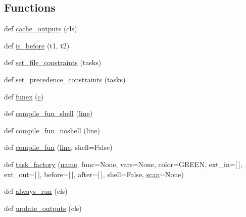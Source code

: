 \subsection*{Functions}
\begin{DoxyCompactItemize}
\item 
def \hyperlink{namespacewaflib_1_1_task_a333db1cc7c2da34b0f075a6806aa4fb0}{cache\+\_\+outputs} (cls)
\item 
def \hyperlink{namespacewaflib_1_1_task_a310bd3e0cfd5029a30d31fc0b9d74ebc}{is\+\_\+before} (t1, t2)
\item 
def \hyperlink{namespacewaflib_1_1_task_acc993d37750a37787ed0b8f659f1c0bf}{set\+\_\+file\+\_\+constraints} (tasks)
\item 
def \hyperlink{namespacewaflib_1_1_task_a0ac0b790b0d39c7a9c17c521b25b8cee}{set\+\_\+precedence\+\_\+constraints} (tasks)
\item 
def \hyperlink{namespacewaflib_1_1_task_a0fe5bbefccccafa511b2b51377f60bdc}{funex} (\hyperlink{rfft2d_test_m_l_8m_ae0323a9039add2978bf5b49550572c7c}{c})
\item 
def \hyperlink{namespacewaflib_1_1_task_a2c264ecea0ed1b0ef6774cd499f30364}{compile\+\_\+fun\+\_\+shell} (\hyperlink{seqread_8c_aad9ebcdde542d8b2075615388ff15a9c}{line})
\item 
def \hyperlink{namespacewaflib_1_1_task_afb4b30ad29fc76227e019d80c31d99ea}{compile\+\_\+fun\+\_\+noshell} (\hyperlink{seqread_8c_aad9ebcdde542d8b2075615388ff15a9c}{line})
\item 
def \hyperlink{namespacewaflib_1_1_task_ab362b343e90d74ae2992b6f1e51cf58e}{compile\+\_\+fun} (\hyperlink{seqread_8c_aad9ebcdde542d8b2075615388ff15a9c}{line}, shell=False)
\item 
def \hyperlink{namespacewaflib_1_1_task_a781c8ebb9be40227b502fef4a729dd5c}{task\+\_\+factory} (\hyperlink{lib_2expat_8h_a1b49b495b59f9e73205b69ad1a2965b0}{name}, func=None, vars=None, color=\textquotesingle{}G\+R\+E\+EN\textquotesingle{}, ext\+\_\+in=\mbox{[}$\,$\mbox{]}, ext\+\_\+out=\mbox{[}$\,$\mbox{]}, before=\mbox{[}$\,$\mbox{]}, after=\mbox{[}$\,$\mbox{]}, shell=False, \hyperlink{seqread_8c_abbf056a5fc06531cfc2da9d8e8330393}{scan}=None)
\item 
def \hyperlink{namespacewaflib_1_1_task_add4cb14fcb77eda6b8ae4f2dd85c068c}{always\+\_\+run} (cls)
\item 
def \hyperlink{namespacewaflib_1_1_task_a7530051e65313a94092ad06115c24fd1}{update\+\_\+outputs} (cls)
\end{DoxyCompactItemize}

